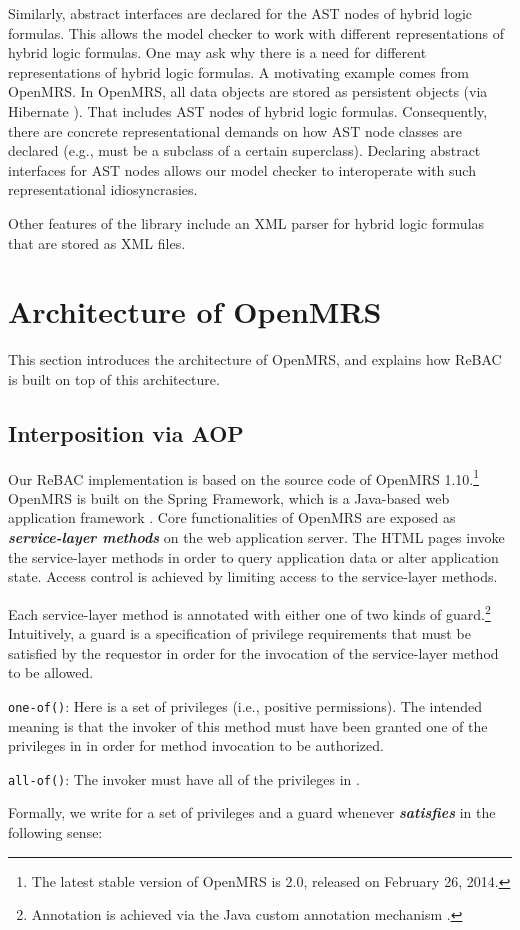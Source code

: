 \documentclass{acm_proc_article-sp}
\newcommand{\Dfn}[1]{\textbf{\emph{#1}}}
\newcommand{\textcode}[1]{\texttt{#1}}
\begin{document}
Similarly, abstract interfaces are declared for the AST nodes of
hybrid logic formulas.  This allows the model checker to work with
different representations of hybrid logic formulas.  One may ask why
there is a need for different representations of hybrid logic
formulas.  A motivating example comes from OpenMRS.  In OpenMRS, all
data objects are stored as persistent objects (via Hibernate
\cite{Hibernate}).  That includes AST nodes of hybrid logic formulas.
Consequently, there are concrete representational demands on how AST
node classes are declared (e.g., must be a subclass of a certain
superclass).  Declaring abstract interfaces for AST nodes allows our
model checker to interoperate with such representational
idiosyncrasies.

Other features of the library include an XML parser for hybrid logic
formulas that are stored as XML files.


\section{Architecture of O\MakeLowercase{pen}MRS}
\label{sec-architecture}

This section introduces the architecture of OpenMRS, and explains
how ReBAC is built on top of this architecture.


\subsection{Interposition via AOP}

Our ReBAC implementation is based on the source code of OpenMRS
1.10.\footnote{The latest stable version of OpenMRS is 2.0, released
  on February 26, 2014.}  OpenMRS is built on the Spring Framework,
which is a Java-based web application framework \cite{Spring}.  Core
functionalities of OpenMRS are exposed as \Dfn{service-layer methods}
on the web application server.  The HTML pages invoke the
service-layer methods in order to query application data or alter
application state.  Access control is achieved by limiting access to
the service-layer methods.

Each service-layer method is annotated with either one of two kinds of
guard.\footnote{Annotation is achieved via the Java custom annotation
  mechanism \cite[\S 9.7]{JavaLangSpec}.}  Intuitively, a guard is a
specification of privilege requirements that must be satisfied by the
requestor in order for the invocation of the service-layer method to
be allowed.
\begin{compactenum}
\item \textcode{one-of()}: Here  is a set of privileges (i.e., 
 positive permissions). The intended meaning is that the invoker of
 this method must have been granted one of the privileges in 
 in order for method invocation to be authorized.
\item \textcode{all-of()}: The invoker must have all of the
  privileges in .
\end{compactenum}
Formally, we write  for a set  of privileges and a
guard  whenever  \Dfn{satisfies}  in the following sense:
\end{document}
